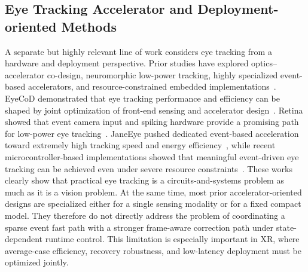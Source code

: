\documentclass[journal]{IEEEtran}
\begin{document}
\subsection{Eye Tracking Accelerator and Deployment-oriented Methods}
A separate but highly relevant line of work considers eye tracking from a hardware and deployment perspective. Prior studies have explored optics--accelerator co-design, neuromorphic low-power tracking, highly specialized event-based accelerators, and resource-constrained embedded implementations~\cite{you2022eyecod,bonazzi2024retina,han2026janeeye,giordano2025sub}. EyeCoD demonstrated that eye tracking performance and efficiency can be shaped by joint optimization of front-end sensing and accelerator design~\cite{you2022eyecod}. Retina showed that event camera input and spiking hardware provide a promising path for low-power eye tracking~\cite{bonazzi2024retina}. JaneEye pushed dedicated event-based acceleration toward extremely high tracking speed and energy efficiency~\cite{han2026janeeye}, while recent microcontroller-based implementations showed that meaningful event-driven eye tracking can be achieved even under severe resource constraints~\cite{giordano2025sub}.
%
These works clearly show that practical eye tracking is a circuits-and-systems problem as much as it is a vision problem. At the same time, most prior accelerator-oriented designs are specialized either for a single sensing modality or for a fixed compact model. They therefore do not directly address the problem of coordinating a sparse event fast path with a stronger frame-aware correction path under state-dependent runtime control. This limitation is especially important in XR, where average-case efficiency, recovery robustness, and low-latency deployment must be optimized jointly.
%
\end{document}
